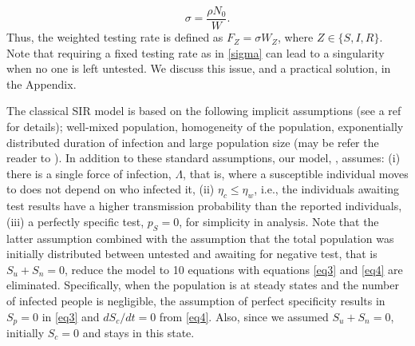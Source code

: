 \documentclass[12pt]{article}
\theoremstyle{definition} %
\begin{document}
\begin{equation}
\label{sigma}
\sigma = \frac{\rho N_0}{W}.
\end{equation}
Thus, the weighted testing rate is defined as $F_Z=\sigma W_Z$, where $Z \in \{S,I,R\}$. Note that requiring a fixed testing rate as in \eqref{sigma} can lead to a singularity when no one is left untested. We discuss this issue, and a practical solution, in the Appendix. 

The classical SIR model is based on the following implicit assumptions (see a ref for details); well-mixed population, homogeneity of the population, exponentially distributed duration of infection and large population size (may be refer the reader to \cite{keeling2011modeling}). In addition to these standard assumptions, our model, , assumes: (i) there is a single force of infection, $\Lambda$, that is, where a susceptible individual moves to does not depend on who infected it, (ii) $\eta_c \leq \eta_w$, i.e., the individuals awaiting test results have a higher transmission probability than the reported individuals, (iii) a perfectly specific test, $p_S=0$, for simplicity in analysis. Note that the latter assumption combined with the assumption that the total population was initially distributed between untested and awaiting for negative test, that is $S_u+S_n=0$, reduce the model to 10 equations with equations \ref{eq3} and \ref{eq4} are eliminated. Specifically, when the population is at steady states and the number of infected people is negligible, the assumption of perfect specificity results in $S_p=0$ in \cref{eq3} and $d S_c/dt=0$ from \cref{eq4}. Also, since we assumed $S_u+S_n=0$, initially $S_c=0$ and stays in this state.
\end{document}
